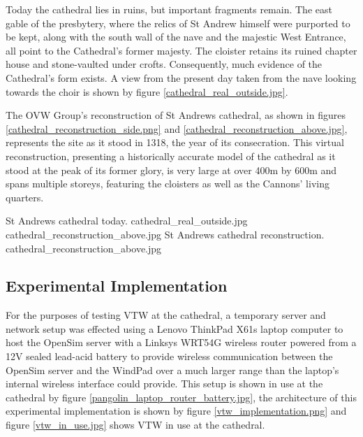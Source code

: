 Today the cathedral lies in ruins, but important fragments remain. The east gable of the presbytery, where the relics of St Andrew himself were purported to be kept, along with the south wall of the nave and the majestic West Entrance, all point to the Cathedral’s former majesty. The cloister retains its ruined chapter house and stone-vaulted under crofts. Consequently, much evidence of the Cathedral’s form exists. A view from the present day taken from the nave looking towards the choir is shown by figure \ref{cathedral_real_outside.jpg}.


The OVW Group's reconstruction of St Andrews cathedral, as shown in figures \ref{cathedral_reconstruction_side.png} and \ref{cathedral_reconstruction_above.jpg}, represents the site as it stood in 1318, the year of its consecration. This virtual reconstruction, presenting a historically accurate model of the cathedral as it stood at the peak of its former glory, is very large at over 400m by 600m and spans multiple storeys, featuring the cloisters as well as the Cannons' living quarters.

 {St Andrews cathedral today.} {cathedral_real_outside.jpg}
       {cathedral_reconstruction_above.jpg} {St Andrews cathedral reconstruction.} {cathedral_reconstruction_above.jpg}


\subsection{Experimental Implementation}




For the purposes of testing VTW at the cathedral, a temporary server and network setup was effected using a Lenovo ThinkPad X61s\thinkpadFootnote{} laptop computer to host the OpenSim server with a Linksys WRT54G\wrtFootnote{} wireless router powered from a 12V sealed lead-acid battery to provide wireless communication between the OpenSim server and the WindPad over a much larger range than the laptop's internal wireless interface could provide. This setup is shown in use at the cathedral by figure \ref{pangolin_laptop_router_battery.jpg}, the architecture of this experimental implementation is shown by figure \ref{vtw_implementation.png} and figure \ref{vtw_in_use.jpg} shows VTW in use at the cathedral.

